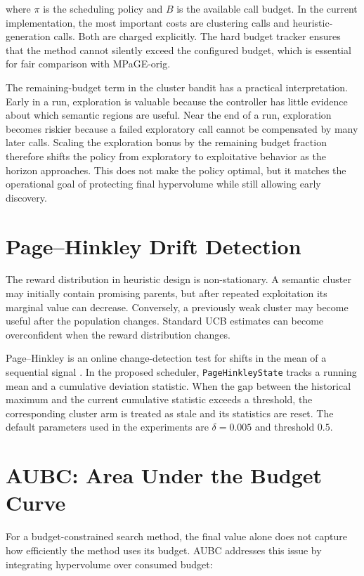 \documentclass[../main.tex]{subfiles}
\begin{document}
where $\pi$ is the scheduling policy and $B$ is the available call budget. In the current implementation, the most important costs are clustering calls and heuristic-generation calls. Both are charged explicitly. The hard budget tracker ensures that the method cannot silently exceed the configured budget, which is essential for fair comparison with MPaGE-orig.

The remaining-budget term in the cluster bandit has a practical interpretation. Early in a run, exploration is valuable because the controller has little evidence about which semantic regions are useful. Near the end of a run, exploration becomes riskier because a failed exploratory call cannot be compensated by many later calls. Scaling the exploration bonus by the remaining budget fraction therefore shifts the policy from exploratory to exploitative behavior as the horizon approaches. This does not make the policy optimal, but it matches the operational goal of protecting final hypervolume while still allowing early discovery.

\section{Page--Hinkley Drift Detection}

The reward distribution in heuristic design is non-stationary. A semantic cluster may initially contain promising parents, but after repeated exploitation its marginal value can decrease. Conversely, a previously weak cluster may become useful after the population changes. Standard UCB estimates can become overconfident when the reward distribution changes.

Page--Hinkley is an online change-detection test for shifts in the mean of a sequential signal \cite{page1954continuous}. In the proposed scheduler, \texttt{PageHinkleyState} tracks a running mean and a cumulative deviation statistic. When the gap between the historical maximum and the current cumulative statistic exceeds a threshold, the corresponding cluster arm is treated as stale and its statistics are reset. The default parameters used in the experiments are $\delta=0.005$ and threshold $0.5$.

\section{AUBC: Area Under the Budget Curve}

For a budget-constrained search method, the final value alone does not capture how efficiently the method uses its budget. AUBC addresses this issue by integrating hypervolume over consumed budget:
\end{document}
